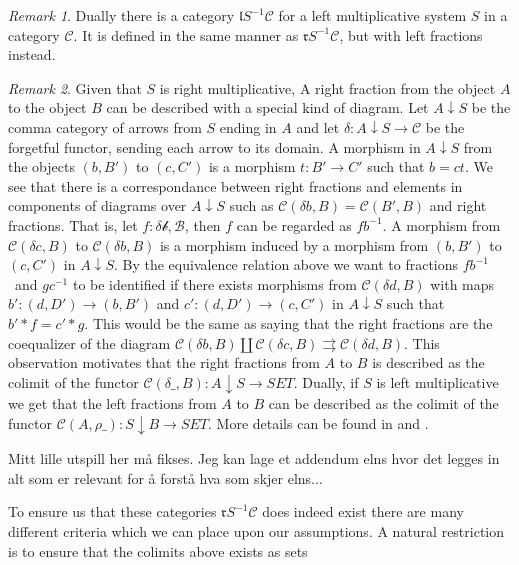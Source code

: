 \documentclass[11pt]{article}
\theoremstyle{definition}
\theoremstyle{remark}
\newtheorem*{remark}{Remark}
\begin{document}
            \begin{remark}
                Dually there is a category $\mathfrak{l}S^{-1}\mathcal{C}$ for a left multiplicative system $S$ in a category $\mathcal{C}$. It is defined in the same manner as $\mathfrak{r}S^{-1}\mathcal{C}$, but with left fractions instead.
            \end{remark}

            \begin{remark}
                Given that $S$ is right multiplicative, A right fraction from the object $A$ to the object $B$ can be described with a special kind of diagram. Let $A\downarrow S$ be the comma category of arrows from $S$ ending in $A$ and let $\delta : A\downarrow S\rightarrow\mathcal{C}$ be the forgetful functor, sending each arrow to its domain. A morphism in $A\downarrow S$ from the objects $(b,B')$ to $(c,C')$ is a morphism $t : B'\rightarrow C'$ such that $b=ct$. We see that there is a correspondance between right fractions and elements in components of diagrams over $A\downarrow S$ such as $\mathcal{C}(\delta b, B)=\mathcal{C}(B',B)$ and right fractions. That is, let $f:\mathcal{\delta b, B}$, then $f$ can be regarded as $fb^{-1}$. A morphism from $\mathcal{C}(\delta c, B)$ to $\mathcal{C}(\delta b, B)$ is a morphism induced by a morphism from $(b,B')$ to $(c,C')$ in $A\downarrow S$. By the equivalence relation above we want to fractions $fb^{-1}$ and $gc^{-1}$ to be identified if there exists morphisms from $\mathcal{C}(\delta d, B)$ with maps $b' : (d,D')\rightarrow (b,B')$ and $c' : (d,D')\rightarrow (c,C')$ in $A\downarrow S$ such that $b'*f = c'*g$. This would be the same as saying that the right fractions are the coequalizer of the diagram $\mathcal{C}(\delta b, B)\coprod \mathcal{C}(\delta c, B)\rightrightarrows \mathcal{C}(\delta d, B)$. This observation motivates that the right fractions from $A$ to $B$ is described as the colimit of the functor $\mathcal{C}(\delta\_, B):A\downarrow S\rightarrow SET$. Dually, if $S$ is left multiplicative we get that the left fractions from $A$ to $B$ can be described as the colimit of the functor $\mathcal{C}(A, \rho\_):S\downarrow B\rightarrow SET$. More details can be found in \cite{zisman} and \cite{weibel}.
            \end{remark}

            Mitt lille utspill her må fikses. Jeg kan lage et addendum elns hvor det legges in alt som er relevant for å forstå hva som skjer elns...

            To ensure us that these categories $\mathfrak{r}S^{-1}\mathcal{C}$ does indeed exist there are many different criteria which we can place upon our assumptions. A natural restriction is to ensure that the colimits above exists as sets
\end{document}
